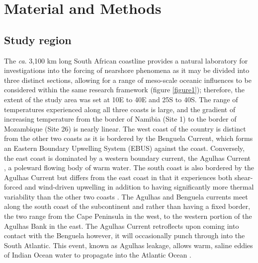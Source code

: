 \documentclass[utf8]{frontiersSCNS}
\begin{document}
\section{Material and Methods}
\subsection{Study region}
The \emph{ca}. 3,100 km long South African coastline provides a natural laboratory for investigations into the forcing of nearshore phenomena as it may be divided into three distinct sections, allowing for a range of meso-scale oceanic influences to be considered within the same research framework (figure \ref{figure1}); therefore, the extent of the study area was set at 10\degree E to 40\degree E and 25\degree S to 40\degree S. The range of temperatures experienced along all three coasts is large, and the gradient of increasing temperature from the border of Namibia (Site 1) to the border of Mozambique (Site 26) is nearly linear. The west coast of the country is distinct from the other two coasts as it is bordered by the Benguela Current, which forms an Eastern Boundary Upwelling System (EBUS) \citep{Hutchings2009} against the coast. Conversely, the east coast is dominated by a western boundary current, the Agulhas Current \citep{Luning1990}, a poleward flowing body of warm water. The south coast is also bordered by the Agulhas Current but differs from the east coast in that it experiences both shear-forced and wind-driven upwelling \citep{Lutjeharms2000a} in addition to having significantly more thermal variability than the other two coasts \citep{Schlegel2017}. The Agulhas and Benguela currents meet along the south coast of the subcontinent and rather than having a fixed border, the two range from the Cape Peninsula in the west, to the western portion of the Agulhas Bank in the east. The Agulhas Current retroflects upon coming into contact with the Benguela \citep{Hutchings2009} however, it will occasionally punch through into the South Atlantic. This event, known as Agulhas leakage, allows warm, saline eddies of Indian Ocean water to propagate into the Atlantic Ocean \citep{Beal2011}.
\end{document}
